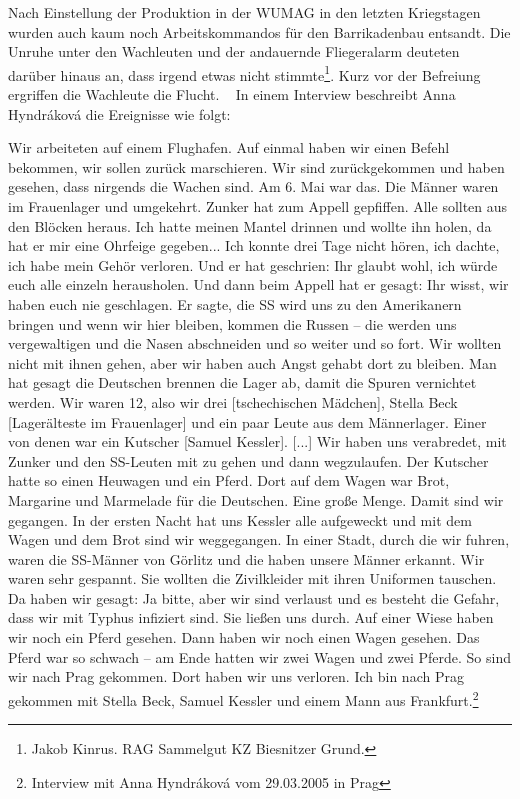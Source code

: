 Nach Einstellung der Produktion in der WUMAG in den letzten Kriegstagen wurden auch kaum noch Arbeitskommandos für den Barrikadenbau entsandt. Die Unruhe unter den Wachleuten und der andauernde Fliegeralarm deuteten darüber hinaus an, dass \glqq irgend etwas nicht stimmte\grqq\footnote{Jakob Kinrus. RAG Sammelgut KZ Biesnitzer Grund.}. Kurz vor der Befreiung ergriffen die Wachleute die Flucht.
~\newline
In einem Interview beschreibt Anna Hyndr\'akov\'a die Ereignisse wie folgt:
\begin{leftbar} 
Wir arbeiteten auf einem Flughafen. Auf einmal haben wir einen Befehl bekommen, wir sollen zurück marschieren. Wir sind zurückgekommen und haben gesehen, dass nirgends die Wachen sind. Am 6. Mai war das. Die Männer waren im Frauenlager und umgekehrt. Zunker hat zum Appell gepfiffen. Alle sollten aus den Blöcken heraus. Ich hatte meinen Mantel drinnen und wollte ihn holen, da hat er mir eine Ohrfeige gegeben... Ich konnte drei Tage nicht hören, ich dachte, ich habe mein Gehör verloren. Und er hat geschrien: \glqq Ihr glaubt wohl, ich würde euch alle einzeln herausholen\grqq. Und dann beim Appell hat er gesagt: \glqq Ihr wisst, wir haben euch nie geschlagen\grqq. Er sagte, die SS wird uns zu den Amerikanern bringen und wenn wir hier bleiben, kommen die Russen -- die werden uns vergewaltigen und die Nasen abschneiden und so weiter und so fort. Wir wollten nicht mit ihnen gehen, aber wir haben auch Angst gehabt dort zu bleiben. Man hat gesagt die Deutschen brennen die Lager ab, damit die Spuren vernichtet werden.\newline
Wir waren 12, also wir drei [tschechischen Mädchen], Stella Beck [Lagerälteste im Frauenlager] und ein paar Leute aus dem Männerlager. Einer von denen war ein Kutscher [Samuel Kessler]. [...] Wir haben uns verabredet, mit Zunker und den SS-Leuten mit zu gehen und dann wegzulaufen. Der Kutscher hatte so einen Heuwagen und ein Pferd. Dort auf dem Wagen war Brot, Margarine und Marmelade für die Deutschen. Eine große Menge. Damit sind wir gegangen. In der ersten Nacht hat uns Kessler alle aufgeweckt und mit dem Wagen und dem Brot sind wir weggegangen.\newline
In einer Stadt, durch die wir fuhren, waren die SS-Männer von Görlitz und die haben unsere Männer erkannt. Wir waren sehr gespannt. Sie wollten die Zivilkleider mit ihren Uniformen tauschen. Da haben wir gesagt: Ja bitte, aber wir sind verlaust und es besteht die Gefahr, dass wir mit Typhus infiziert sind. Sie ließen uns durch. Auf einer Wiese haben wir noch ein Pferd gesehen. Dann haben wir noch einen Wagen gesehen. Das Pferd war so schwach -- am Ende hatten wir zwei Wagen und zwei Pferde. So sind wir nach Prag gekommen. Dort haben wir uns verloren. Ich bin nach Prag gekommen mit Stella Beck, Samuel Kessler und einem Mann aus Frankfurt.\footnote{Interview mit Anna Hyndr\'akov\'a vom 29.03.2005 in Prag}
\end{leftbar}
